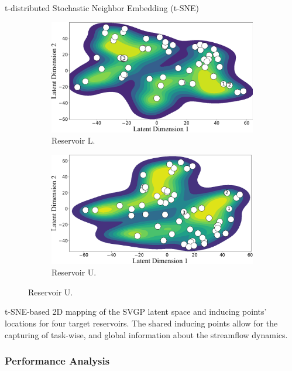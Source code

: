 \begin{frame}{t-distributed Stochastic Neighbor Embedding (t-SNE)}
\begin{figure}[htbp]
		\begin{subfigure}[t]{0.38\columnwidth}
			\centering
			\includegraphics[width=\columnwidth]{chp_sogp/figures/TSNE_task11_kde_p30.png}
			\caption{Reservoir L.}
		\end{subfigure}
		\hspace{0.05\columnwidth} %
		\begin{subfigure}[t]{0.38\columnwidth}
			\centering
			\includegraphics[width=\columnwidth]{chp_sogp/figures/TSNE_task20_kde_p30.png}
			\caption{Reservoir U.}
		\end{subfigure}
		
		\vspace{0.0cm} %
	\end{figure}
	t-SNE-based 2D mapping of the SVGP latent space and inducing points' locations for four target reservoirs. The shared inducing points allow for the capturing of task-wise, and global information about the streamflow dynamics.
\end{frame}


\subsubsection{Performance Analysis}


